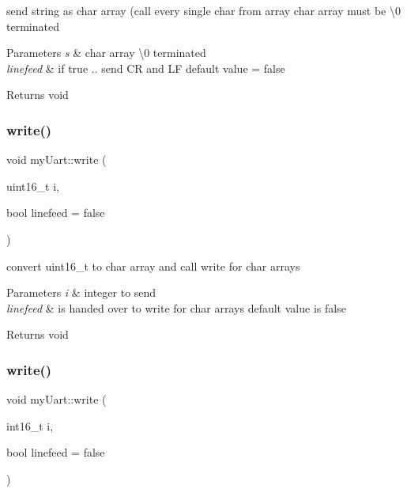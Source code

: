 send string as char array (call every single char from array char array must be \textquotesingle{}\textbackslash{}0\textquotesingle{} terminated 


\begin{DoxyParams}{Parameters}
{\em s} & char array \textquotesingle{}\textbackslash{}0\textquotesingle{} terminated \\
\hline
{\em linefeed} & if true .. send CR and LF default value = false \\
\hline
\end{DoxyParams}
\begin{DoxyReturn}{Returns}
void 
\end{DoxyReturn}
\mbox{\label{classmy_uart_a0807f0ccd0457eb6965513fed7a8c699}} 
\subsubsection{\texorpdfstring{write()}{write()}\hspace{0.1cm}{\footnotesize\ttfamily [3/8]}}
{\footnotesize\ttfamily void my\+Uart\+::write (\begin{DoxyParamCaption}\item[{uint16\+\_\+t}]{i,  }\item[{bool}]{linefeed = {\ttfamily false} }\end{DoxyParamCaption})}



convert uint16\+\_\+t to char array and call write for char arrays 


\begin{DoxyParams}{Parameters}
{\em i} & integer to send \\
\hline
{\em linefeed} & is handed over to write for char arrays default value is false \\
\hline
\end{DoxyParams}
\begin{DoxyReturn}{Returns}
void 
\end{DoxyReturn}
\mbox{\label{classmy_uart_a49fd7a42b8cebe109f82c13f56f70b86}} 
\subsubsection{\texorpdfstring{write()}{write()}\hspace{0.1cm}{\footnotesize\ttfamily [4/8]}}
{\footnotesize\ttfamily void my\+Uart\+::write (\begin{DoxyParamCaption}\item[{int16\+\_\+t}]{i,  }\item[{bool}]{linefeed = {\ttfamily false} }\end{DoxyParamCaption})}



